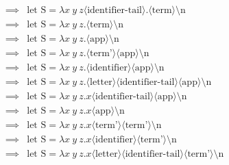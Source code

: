 \documentclass[12pt, a4paper, oneside]{memoir}
\begin{document}
\begin{align*}
    \implies{} & \text{let } \text{S} = \lambda x\ y\ z \langle \text{identifier-tail} \rangle.\langle \text{term} \rangle \text{\textbackslash n}                                                             \\
    \implies{} & \text{let } \text{S} = \lambda x\ y\ z.\langle \text{term} \rangle \text{\textbackslash n}                                                                                                    \\
    \implies{} & \text{let } \text{S} = \lambda x\ y\ z.\langle \text{app} \rangle \text{\textbackslash n}                                                                                                     \\
    \implies{} & \text{let } \text{S} = \lambda x\ y\ z.\langle \text{term'} \rangle \langle \text{app} \rangle\text{\textbackslash n}                                                                         \\
    \implies{} & \text{let } \text{S} = \lambda x\ y\ z.\langle \text{identifier} \rangle \langle \text{app} \rangle\text{\textbackslash n}                                                                    \\
    \implies{} & \text{let } \text{S} = \lambda x\ y\ z.\langle \text{letter} \rangle \langle \text{identifier-tail} \rangle \langle \text{app} \rangle\text{\textbackslash n}                                 \\
    \implies{} & \text{let } \text{S} = \lambda x\ y\ z.x \langle \text{identifier-tail} \rangle \langle \text{app} \rangle\text{\textbackslash n}                                                             \\
    \implies{} & \text{let } \text{S} = \lambda x\ y\ z.x \langle \text{app} \rangle\text{\textbackslash n}                                                                                                    \\
    \implies{} & \text{let } \text{S} = \lambda x\ y\ z.x \langle \text{term'} \rangle \langle \text{term'} \rangle \text{\textbackslash n}                                                                    \\
    \implies{} & \text{let } \text{S} = \lambda x\ y\ z.x \langle \text{identifier} \rangle \langle \text{term'} \rangle \text{\textbackslash n}                                                               \\
    \implies{} & \text{let } \text{S} = \lambda x\ y\ z.x \langle \text{letter} \rangle \langle \text{identifier-tail} \rangle \langle \text{term'} \rangle \text{\textbackslash n}                            \\

\end{align*}
\end{document}
